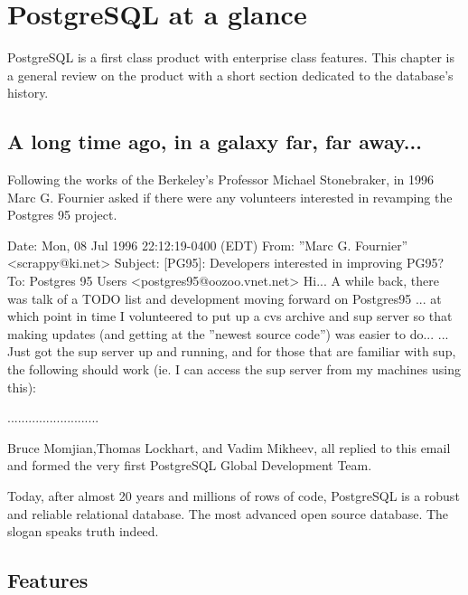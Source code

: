 \chapter{PostgreSQL at a glance}

PostgreSQL is a first class product with enterprise class features. This
chapter is a general review on the product with a short section dedicated to
the database's history.

\section{A long time ago, in a galaxy far, far away...}

Following the works of the Berkeley's Professor Michael Stonebraker, in 1996
Marc G. Fournier asked if there were any volunteers
interested in revamping the Postgres 95 project.\newline

\begin{smallverbatim}

Date: Mon, 08 Jul 1996 22:12:19-0400 (EDT)
From: ”Marc G. Fournier” <scrappy@ki.net>
Subject: [PG95]: Developers interested in improving PG95?
To: Postgres 95 Users <postgres95@oozoo.vnet.net>
Hi... A while back, there was talk of a TODO list and development moving forward on Postgres95 ...
at which point in time I volunteered to put up a cvs archive and sup server so that making updates
(and getting at the ”newest source code”) was easier to do...
... Just got the sup server up and running, and for those that are familiar with sup, the following
should work (ie. I can access the sup server from my machines using this):

..........................

\end{smallverbatim}

Bruce Momjian,Thomas Lockhart, and
Vadim Mikheev, all replied to this email and formed the
very first PostgreSQL Global Development Team.\newline

Today, after almost 20 years and millions of rows of code, PostgreSQL is a
robust and reliable relational database. The most advanced open source
database. The slogan speaks truth indeed.

\section{Features}


